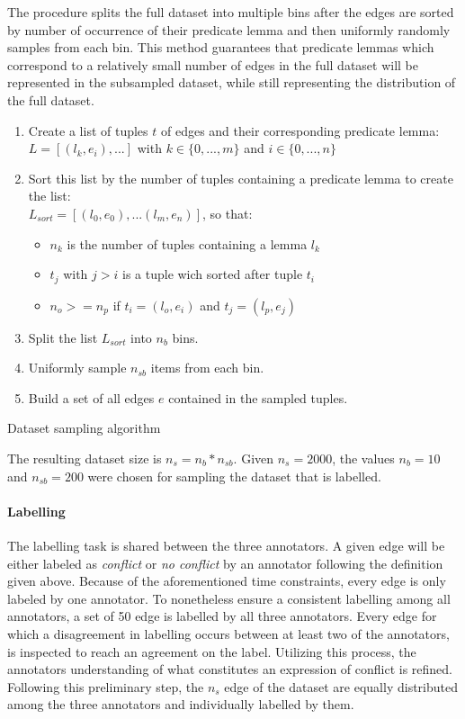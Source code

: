 \documentclass[11pt]{scrreprt}
\begin{document}
The procedure splits the full dataset into multiple bins after the edges are sorted by number of occurrence of their predicate lemma and then uniformly randomly samples from each bin. This method guarantees that predicate lemmas which correspond to a relatively small number of edges in the full dataset will be represented in the subsampled dataset, while still representing the distribution of the full dataset. 


\begin{algorithm}
\begin{enumerate}
	\item Create a list of tuples \(t\) of edges and their corresponding predicate lemma: \\ \(L = [(l_k, e_i), ...]\) with \(k \in \{0,...,m\}\) and \(i \in \{0,...,n\}\)
	\item Sort this list by the number of tuples containing a predicate lemma to create the list: \\ \(L_{sort} = [(l_0, e_0), ... (l_m, e_n)]\), so that:
	\begin{itemize}
		\item \(n_k\) is the number of tuples containing a lemma \(l_k\)
		\item \(t_j\) with \(j > i\) is a tuple wich sorted after tuple \(t_i\)
		\item \(n_o >= n_p\) if \(t_i = (l_o, e_i)\) and \(t_j = (l_p, e_j)\)
	\end{itemize}			
	\item Split the list \(L_{sort}\) into \(n_{b}\) bins.
	\item Uniformly sample \(n_{sb}\) items from each bin.
	\item Build a set of all edges \(e\) contained in the sampled tuples.
\end{enumerate}
\caption{Dataset sampling algorithm}
\label{algo:dataset-sampling}
\end{algorithm}

The resulting dataset size is \(n_{s} = n_{b} * n_{sb}\). Given \(n_{s} = 2000\), the values \(n_b = 10\) and \(n_{sb} = 200\) were chosen for sampling the dataset that is labelled.


\paragraph{Labelling}
The labelling task is shared between the three annotators. A given edge will be either labeled as \textit{conflict} or \textit{no conflict} by an annotator following the definition given above. Because of the aforementioned time constraints, every edge is only labeled by one annotator. To nonetheless ensure a consistent labelling among all annotators, a set of 50 edge is labelled by all three annotators. Every edge for which a disagreement in labelling occurs between at least two of the annotators, is inspected to reach an agreement on the label. Utilizing this process, the annotators understanding of what constitutes an expression of conflict is refined. Following this preliminary step, the \(n_s\) edge of the dataset are equally distributed among the three annotators and individually labelled by them.
\end{document}
